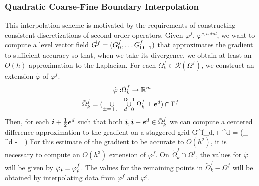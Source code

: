 


\subsubsection{Quadratic Coarse-Fine Boundary Interpolation
\label{sec:quadB}}

This interpolation scheme is motivated by the requirements of
constructing consistent discretizations of second-order operators.
Given $\varphi^f$, $\varphi^{c,valid}$, we want to compute a level
vector field $\vec{G}^f = (G^f_0, \dots G^f_{{\mathbf{D}} - 1})$ that
approximates the gradient to sufficient accuracy so that, when we take
its divergence, we obtain at least an $O(h)$ approximation to the
Laplacian. For each $\Omega^{f}_k \in \mathcal{R}(\Omega^f)$, we
construct an extension $\tilde{\varphi}$ of $\varphi^f$.
\begin{align*}
\tilde{\varphi} : &\tilde{\Omega}^f_k \rightarrow \mathbb{R}^m
\\
\tilde{\Omega}^f_k = (\underset{{\pm = +,-}}{\cup} 
& \overset{{\mathbf{D}}-1}{\underset{d=0}{\cup}} \Omega^f_k
\pm {\boldsymbol{e}}^d) 
\cap \Gamma^f
\end{align*}
Then, for each ${\boldsymbol{i}} + \frac{1}{2} {\boldsymbol{e}}^d$ such that both
${\boldsymbol{i}}, {\boldsymbol{i}} + {\boldsymbol{e}}^d \in \tilde{\Omega}^f_k$ 
we can compute
a centered difference approximation to the gradient on a staggered grid
\beqa
G^f_{d,\ibold + \half \ebold^d} =
(\tilde{\varphi}_{\ibold + \ebold^d} -
\tilde{\varphi}_\ibold)
\eeqa
For this estimate of the gradient to be accurate to $O(h^2)$, it is
necessary to compute an $O(h^3)$ extension of $\varphi^f$.
On $\tilde{\Omega}^f_k \cap \Omega^f$, the values for
$\tilde{\varphi}$ will be given by $\tilde{\varphi}_{\boldsymbol{i}} =
\varphi^f_{\boldsymbol{i}}$.  The values for the remaining points in
$\tilde{\Omega}^f_k - \Omega^f$ will be obtained by interpolating data
from $\varphi^f$ and $\varphi^c$.

